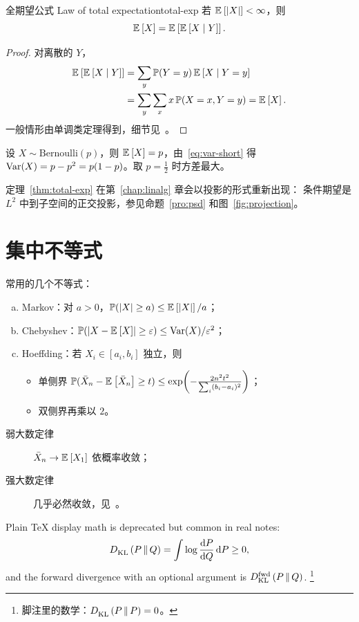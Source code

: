 \begin{theorem}{全期望公式 Law of total expectation}{total-exp}
  若 $\E{\abs{X}} < \infty$，则
  \begin{equation}\label{eq:total-exp}
    \E{X} = \E{\E{X \given Y}}.
  \end{equation}
\end{theorem}

\begin{proof}
  对离散的 $Y$，
  \begin{align*}
    \E{\E{X \given Y}}
      &= \sum_{y} \Prob(Y = y)\, \E{X \given Y = y} \\
      &= \sum_{y} \sum_{x} x\, \Prob(X = x, Y = y)
       = \E{X}.
  \end{align*}
  一般情形由单调类定理得到，细节见~\cite[第 2 章]{zhang2020notes}。
\end{proof}

\begin{example}
  设 $X \sim \mathrm{Bernoulli}(p)$，则 $\E{X} = p$，由~\eqref{eq:var-short} 得
  $\Var(X) = p - p^2 = p(1-p)$。取 $p = \tfrac12$ 时方差最大。
\end{example}

\begin{remark}
  定理~\ref{thm:total-exp} 在第~\ref{chap:linalg} 章会以投影的形式重新出现：
  条件期望是 $L^2$ 中到子空间的正交投影，参见命题~\ref{pro:psd} 和图~\ref{fig:projection}。
\end{remark}

\section{集中不等式}\label{sec:concentration}

常用的几个不等式：
\begin{enumerate}[(a)]
  \item Markov：对 $a > 0$，$\Prob(\abs{X} \ge a) \le \E{\abs{X}} / a$；
  \item Chebyshev：$\Prob(\abs{X - \E{X}} \ge \eps) \le \Var(X)/\eps^2$；
  \item Hoeffding：若 $X_i \in [a_i, b_i]$ 独立，则
    \begin{itemize}
      \item 单侧界 $\Prob(\bar X_n - \E{\bar X_n} \ge t) \le \exp\!\left(-\frac{2n^2t^2}{\sum_i (b_i - a_i)^2}\right)$；
      \item 双侧界再乘以 $2$。
    \end{itemize}
\end{enumerate}

\begin{description}
  \item[弱大数定律] $\bar X_n \to \E{X_1}$ 依概率收敛；
  \item[强大数定律] 几乎必然收敛，见~\cite{li2019lln,smith2021concentration}。
\end{description}

Plain \TeX{} display math is deprecated but common in real notes:
$$
  \KL{P}{Q} = \int \log\frac{\dd P}{\dd Q} \dd P \ge 0,
$$
and the forward divergence with an optional argument is $\KL[\text{fwd}]{P}{Q}$.%
\footnote{脚注里的数学：$\KL{P}{P} = 0$。}
